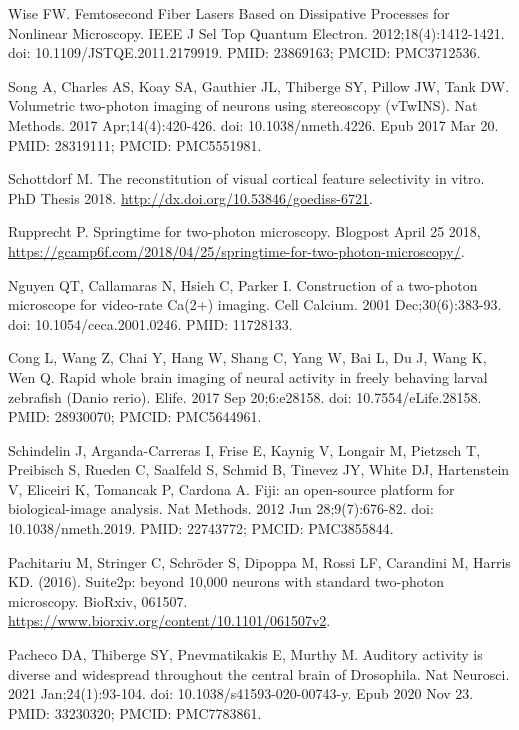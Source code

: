 \documentclass[10pt,letterpaper]{article}
\begin{document}
\begin{thebibliography}{10}
Wise FW. Femtosecond Fiber Lasers Based on Dissipative Processes for Nonlinear Microscopy. IEEE J Sel Top Quantum Electron. 2012;18(4):1412-1421. doi: 10.1109/JSTQE.2011.2179919. PMID: 23869163; PMCID: PMC3712536.

Song A, Charles AS, Koay SA, Gauthier JL, Thiberge SY, Pillow JW, Tank DW. Volumetric two-photon imaging of neurons using stereoscopy (vTwINS). Nat Methods. 2017 Apr;14(4):420-426. doi: 10.1038/nmeth.4226. Epub 2017 Mar 20. PMID: 28319111; PMCID: PMC5551981.

Schottdorf M. The reconstitution of visual cortical feature selectivity in vitro. PhD Thesis 2018. \url{http://dx.doi.org/10.53846/goediss-6721}.

Rupprecht P. Springtime for two-photon microscopy. Blogpost April 25 2018, \url{https://gcamp6f.com/2018/04/25/springtime-for-two-photon-microscopy/}.

Nguyen QT, Callamaras N, Hsieh C, Parker I. Construction of a two-photon microscope for video-rate Ca(2+) imaging. Cell Calcium. 2001 Dec;30(6):383-93. doi: 10.1054/ceca.2001.0246. PMID: 11728133.

Cong L, Wang Z, Chai Y, Hang W, Shang C, Yang W, Bai L, Du J, Wang K, Wen Q. Rapid whole brain imaging of neural activity in freely behaving larval zebrafish (Danio rerio). Elife. 2017 Sep 20;6:e28158. doi: 10.7554/eLife.28158. PMID: 28930070; PMCID: PMC5644961.

Schindelin J, Arganda-Carreras I, Frise E, Kaynig V, Longair M, Pietzsch T, Preibisch S, Rueden C, Saalfeld S, Schmid B, Tinevez JY, White DJ, Hartenstein V, Eliceiri K, Tomancak P, Cardona A. Fiji: an open-source platform for biological-image analysis. Nat Methods. 2012 Jun 28;9(7):676-82. doi: 10.1038/nmeth.2019. PMID: 22743772; PMCID: PMC3855844.

Pachitariu M, Stringer C, Schröder S, Dipoppa M, Rossi LF, Carandini M, Harris KD. (2016). Suite2p: beyond 10,000 neurons with standard two-photon microscopy. BioRxiv, 061507. \url{https://www.biorxiv.org/content/10.1101/061507v2}.

Pacheco DA, Thiberge SY, Pnevmatikakis E, Murthy M. Auditory activity is diverse and widespread throughout the central brain of Drosophila. Nat Neurosci. 2021 Jan;24(1):93-104. doi: 10.1038/s41593-020-00743-y. Epub 2020 Nov 23. PMID: 33230320; PMCID: PMC7783861.


\end{thebibliography}
\end{document}
